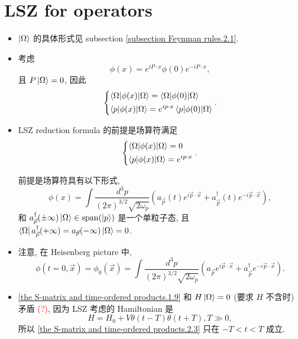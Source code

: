 \section{LSZ for operators} \label{the S-matrix and time-ordered products.2}
\begin{itemize}
	\item $\ket{\Omega}$ 的具体形式见 subsection \ref{subsection Feynman rules.2.1}.
	
	\item 考虑
	\begin{equation}
		\phi(x) = e^{i P \cdot x} \phi(0) e^{- i P \cdot x},
	\end{equation}
	且 $P \ket{\Omega} = 0$, 因此
	\begin{equation}
		\begin{dcases}
			\braket{\Omega | \phi(x) | \Omega} = \braket{\Omega | \phi(0) | \Omega} \\
			\braket{p | \phi(x) | \Omega} = e^{i p \cdot x} \braket{p | \phi(0) | \Omega}
		\end{dcases}.
	\end{equation}
	
	\item LSZ reduction formula 的前提是场算符满足
	\begin{equation} \label{the S-matrix and time-ordered products.2.3}
		\begin{dcases}
			\braket{\Omega | \phi(x) | \Omega} = 0 \\
			\braket{p | \phi(x) | \Omega} = e^{i p \cdot x}
		\end{dcases}.
	\end{equation}
	
	\begin{tcolorbox}[title=remark:]
		前提是场算符具有以下形式,
		\begin{equation}
			\phi(x) = \int \frac{d^3 p}{(2 \pi)^{3 / 2} \sqrt{2 \omega_p}} (a_{\vec{p}}(t) e^{i \vec{p} \cdot \vec{x}} + a^\dag_{\vec{p}}(t) e^{- i \vec{p} \cdot \vec{x}}),
		\end{equation}
		和 $a^\dag_{\vec{p}}(\pm \infty) \ket{\Omega} \in \mathrm{span}(\ket{p})$ 是一个单粒子态, 且 $\bra{\Omega} a^\dag_{\vec{p}}(+ \infty) = a_{\vec{p}}(- \infty) \ket{\Omega} = 0$.
	\end{tcolorbox}
	
	\item 注意, 在 Heisenberg picture 中,
	\begin{equation}
		\phi(t = 0, \vec{x}) = \phi_0(\vec{x}) = \int \frac{d^3 p}{(2 \pi)^{3 / 2} \sqrt{2 \omega_p}} (a_{\vec{p}} e^{i \vec{p} \cdot \vec{x}} + a^\dag_{\vec{p}} e^{- i \vec{p} \cdot \vec{x}}).
	\end{equation}
	
	\item \eqref{the S-matrix and time-ordered products.1.9} 和 $H \ket{\Omega} = 0$ (要求 $H$ 不含时) 矛盾 \textcolor{red}{(?)}, 因为 LSZ 考虑的 Hamiltonian 是
	\begin{equation}
		H = H_0 + V \theta(t - T) \theta(t + T), T \gg 0,
	\end{equation}
	所以 \eqref{the S-matrix and time-ordered products.2.3} 只在 $- T < t < T$ 成立.
\end{itemize}
